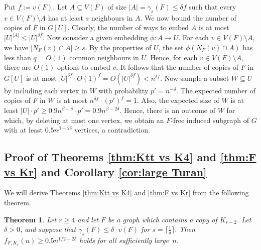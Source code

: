 \documentclass[11pt]{article}
\let\oldendproof\endproof
\renewenvironment{proof}[1][\proofname]{\oldproof[\bf #1]}{\oldendproof}
\theoremstyle{plain}
\newtheorem{theorem}{Theorem}[section]
\theoremstyle{definition}
\begin{document}
\begin{proof}
        Put $f := v(F)$. Let $A \subseteq V(F)$ of size $|A| = \gamma_s(F) \leq \delta f$ such that every $v \in V(F) \setminus A$ has at least $s$ neighbours in $A$. 
        We now bound the number of copies of $F$ in $G[U]$. 
        Clearly, the number of ways to embed $A$ is at most $|U|^{|A|} \leq |U|^{\delta f}$. Now consider a given embedding $\phi : A \rightarrow U$. For each $v \in V(F) \setminus A$, we have $|N_F(v) \cap A| \geq s$. By the properties of $U$, the set $\phi(N_F(v) \cap A)$ has less than $q = O(1)$ common neighbours in $U$. Hence, for each $v \in V(F) \setminus A$, there are $O(1)$ options to embed $v$. It follows that the number of copies of $F$ in $G[U]$ is at most $|U|^{\delta f} \cdot O(1)^f = O(|U|^{\delta f}) < n^{\delta f}$. Now sample a subset $W \subseteq U$ by including each vertex in $W$ with probability $p' = n^{-\delta}$. 
        The expected number of copies of $F$ in $W$ is at most $n^{\delta f} \cdot (p')^f = 1$. Also, the expected size of $W$ is at least $|U| \cdot p' \geq 0.9n^{\beta-\delta} \cdot p' = 0.9n^{\beta - 2\delta}$. Hence, there is an outcome of $W$ for which, by deleting at most one vertex, we obtain an $F$-free induced subgraph of $G$ with at least $0.5n^{\beta-2\delta}$ vertices, a contradiction. 
\end{proof}

\subsection{Proof of Theorems \ref{thm:Ktt vs K4} and \ref{thm:F vs Kr} and Corollary \ref{cor:large Turan}}

We will derive Theorems \ref{thm:Ktt vs K4} and \ref{thm:F vs Kr} from the following theorem.

\begin{theorem}\label{thm:F vs Kr domination}
    Let $r \geq 4$ and let $F$ be a graph which contains a copy of $K_{r-2}$. Let $\delta > 0$, and suppose that $\gamma_s(F) \leq \delta \cdot v(F)$ for $s = \lceil \frac{1}{\delta} \rceil$. Then $f_{F,K_r}(n) \geq 0.5n^{1/2 - 2\delta}$ holds for all sufficiently large~$n$.
\end{theorem}
\end{document}
